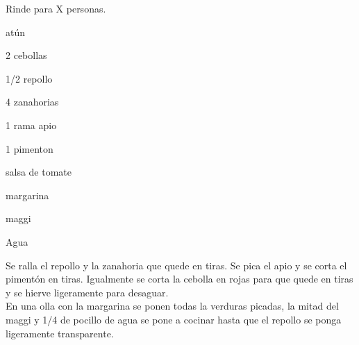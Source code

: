 
Rinde para X personas.

\begin{ingredientes}
\item atún
\item 2 cebollas
\item 1/2 repollo
\item 4 zanahorias
\item 1 rama apio
\item 1 pimenton
\item salsa de tomate
\item margarina
\item maggi
\item Agua
\end{ingredientes}
\preparacion

Se ralla el repollo y la zanahoria que quede en tiras. Se pica el apio y se corta el pimentón en tiras. Igualmente se corta la cebolla en rojas para que quede en tiras y se hierve ligeramente para desaguar.\\

En una olla con la margarina se ponen todas la verduras picadas, la mitad del maggi y 1/4 de pocillo de agua se pone a cocinar hasta que el repollo se ponga ligeramente transparente.